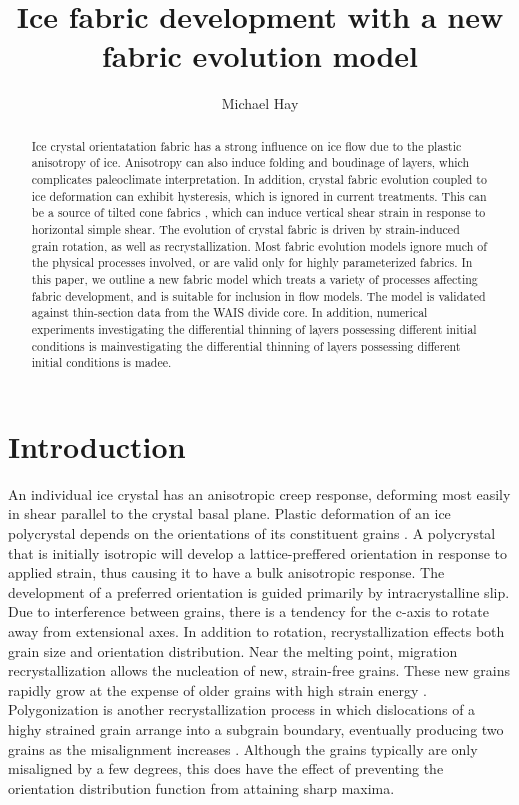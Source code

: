 \documentclass{article}
\title{Ice fabric development with a new fabric evolution model}
\author{Michael Hay}
\begin{document}
\maketitle

\begin{abstract}
Ice crystal orientatation fabric has a strong influence on ice flow due to the plastic anisotropy of ice. Anisotropy can also induce folding and boudinage of layers, which complicates paleoclimate interpretation. In addition, crystal fabric evolution coupled to ice deformation can exhibit hysteresis, which is ignored in current treatments. This can be a source of tilted cone fabrics \citep{throstur2002}, which can induce vertical shear strain in response to horizontal simple shear. The evolution of crystal fabric is driven by strain-induced grain rotation, as well as recrystallization. Most fabric evolution models ignore much of the physical processes involved, or are valid only for highly parameterized fabrics. In this paper, we outline a new fabric model which treats a variety of processes affecting fabric development, and is suitable for inclusion in flow models. The model is validated against thin-section data from the WAIS divide core. In addition, numerical experiments investigating the differential thinning of layers possessing different initial conditions is mainvestigating the differential thinning of layers possessing different initial conditions is madee. 
\end{abstract}

\section{Introduction}
An individual ice crystal has an anisotropic creep response, deforming most easily in shear parallel to the crystal basal plane. Plastic deformation of an ice polycrystal depends on the orientations of its constituent grains \citep{azuma94}. A polycrystal that is initially isotropic will develop a lattice-preffered orientation in response to applied strain, thus causing it to have a bulk anisotropic response. The development of a preferred orientation is guided primarily by intracrystalline slip. Due to interference between grains, there is a tendency for the c-axis to rotate away from extensional axes. In addition to rotation, recrystallization effects both grain size and orientation distribution. Near the melting point, migration recrystallization allows the nucleation of new, strain-free grains. These new grains rapidly grow at the expense of older grains with high strain energy \citep{duval1995}. Polygonization is another recrystallization process in which dislocations of a highy strained grain arrange into a subgrain boundary, eventually producing two grains as the misalignment increases \citep{alley96}. Although the grains typically are only misaligned by a few degrees, this does have the effect of preventing the orientation distribution function from attaining sharp maxima.
\end{document}
